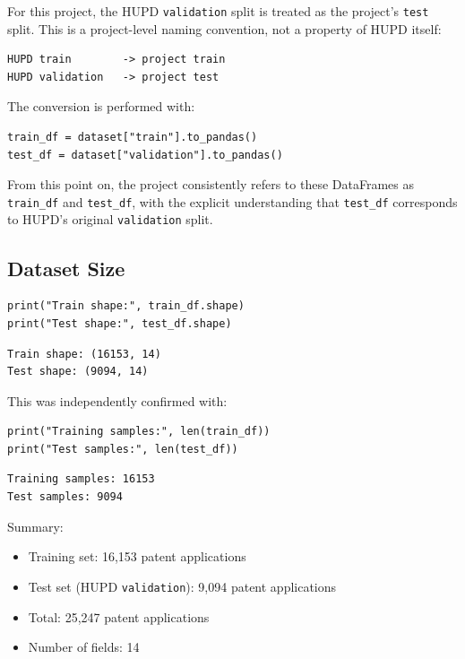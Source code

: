 \documentclass[11pt]{article}
\begin{document}
For this project, the HUPD \texttt{validation} split is treated as the project's \texttt{test} split. This is a project-level naming convention, not a property of HUPD itself:

\begin{lstlisting}
HUPD train        -> project train
HUPD validation   -> project test
\end{lstlisting}

\noindent The conversion is performed with:

\begin{lstlisting}
train_df = dataset["train"].to_pandas()
test_df = dataset["validation"].to_pandas()
\end{lstlisting}

\noindent From this point on, the project consistently refers to these DataFrames as \texttt{train\_df} and \texttt{test\_df}, with the explicit understanding that \texttt{test\_df} corresponds to HUPD's original \texttt{validation} split.

\subsection{Dataset Size}

\begin{lstlisting}
print("Train shape:", train_df.shape)
print("Test shape:", test_df.shape)
\end{lstlisting}

\begin{lstlisting}
Train shape: (16153, 14)
Test shape: (9094, 14)
\end{lstlisting}

\noindent This was independently confirmed with:

\begin{lstlisting}
print("Training samples:", len(train_df))
print("Test samples:", len(test_df))
\end{lstlisting}

\begin{lstlisting}
Training samples: 16153
Test samples: 9094
\end{lstlisting}

\noindent Summary:

\begin{itemize}
    \item Training set: 16,153 patent applications
    \item Test set (HUPD \texttt{validation}): 9,094 patent applications
    \item Total: 25,247 patent applications
    \item Number of fields: 14
\end{itemize}
\end{document}
